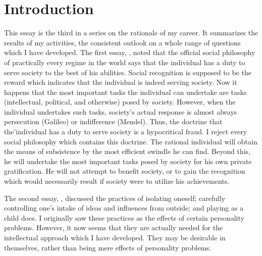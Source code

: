 \chapter{Introduction}


This essay is the third in a series on the rationale of my career. It 
summarizes the results of my activities, the consistent outlook on a whole 
range of questions which I have developed. The first essay, 
, noted that the official social philosophy of practically every 
regime in the world says that the individual has a duty to serve society to the 
best of his abilities. Social recognition is supposed to be the reward which 
indicates that the individual is indeed serving society. Now it happens that 
the most important tasks the individual can undertake are tasks (intellectual, 
political, and otherwise) posed by society. However, when the individual 
undertakes such tasks, society's actual response is almost always persecution 
(Galileo) or indifference (Mendel). Thus, the doctrine that the'individual has 
a duty to serve society is a hypocritical fraud. I reject every social 
philosophy which contains this doctrine. The rational individual will obtain 
the means of subsistence by the most efficient swindle he can find. Beyond 
this, he will undertake the most important tasks posed by society for his 
own private gratification. He will not attempt to benefit society, or to gain 
the recognition which would necessarily result if society were to utilize his 
achievements. 

The second essay, , discussed the practices of isolating oneself; 
carefully controlling one's intake of ideas and influences from outside; and 
playing as a child does. I originally saw these practices as the effects of 
certain personality problems. However, it now seems that they are actually 
needed for the intellectual approach which I have developed. They may be 
desirable in themselves, rather than being mere effects of personality 
problems. 

